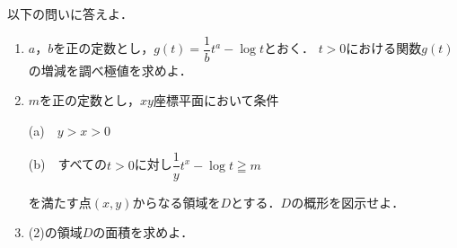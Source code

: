 \documentclass[../../main.tex]{subfiles}
\begin{document}
以下の問いに答えよ．
\begin{enumerate}
  \item $a$，$b$を正の定数とし，$\displaystyle g(t)=\dfrac{1}{b}t^a-\log t$とおく．
    $t>0$における関数$g(t)$の増減を調べ極値を求めよ．
  \item $m$を正の定数とし，$xy$座標平面において条件

    (a)　$y>x>0$

    (b)　すべての$t>0$に対し$\displaystyle\dfrac{1}{y}t^x-\log t \geqq m$

    を満たす点$(x,y)$からなる領域を$D$とする．$D$の概形を図示せよ．
  \item (2)の領域$D$の面積を求めよ．
\end{enumerate}
\end{document}
